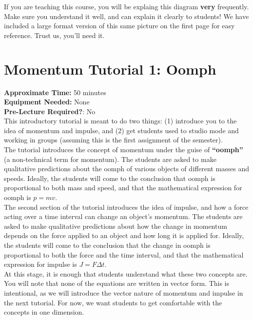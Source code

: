 If you are teaching this course, you will be explaing this diagram \textbf{very} frequently.
Make sure you understand it well, and can explain it clearly to students! We have included a
large format version of this same picture on the first page for easy reference. Trust us, you'll need it. \\ 

\newpage
\section{Momentum Tutorial 1: Oomph}

\textbf{Approximate Time:} 50 minutes \\
\textbf{Equipment Needed:} None \\
\textbf{Pre-Lecture Required?}: No \\

This introductory tutorial is meant to do two things: (1) introduce you to the idea of momentum
and impulse, and (2) get students used to studio mode and working in groups (assuming this is
the first assignment of the semester). \\

The tutorial introduces the concept of momentum under the guise of \textbf{``oomph''} (a non-technical term
for momentum). The students are asked to make qualitative predictions about the oomph of various objects
of different masses and speeds.  Ideally, the students will come to the conclusion that oomph is proportional
to both mass and speed, and that the mathematical expression for oomph is $p = mv$.\\

The second section of the tutorial introduces the idea of impulse, and how a force acting over a time interval
can change an object's momentum.  The students are asked to make qualitative predictions about how the
change in momentum depends on the force applied to an object and how long it is applied for.  Ideally, the students will come to the conclusion
that the change in oomph is proportional to both the force and the time interval, and that the mathematical expression for impulse is
$J = F \Delta t$. \\

At this stage, it is enough that students understand what these two concepts are.  You will note
that none of the equations are written in vector form.  This is intentional, as we will introduce
the vector nature of momentum and impulse in the next tutorial.  For now, we want students
to get comfortable with the concepts in one dimension. \\

